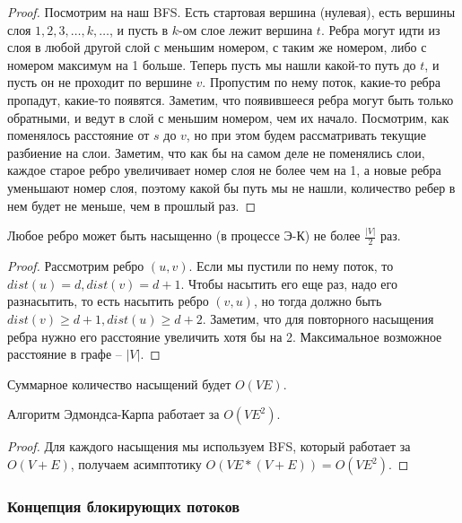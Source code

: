 \begin{proof}
    Посмотрим на наш BFS. Есть стартовая вершина (нулевая), есть вершины слоя $1, 2, 3, \ldots, k, \ldots$, и пусть в $k$-ом слое лежит вершина $t$. Ребра могут идти из слоя в любой другой слой с меньшим номером, с таким же номером, либо с номером максимум на 1 больше. Теперь пусть мы нашли какой-то путь до $t$, и пусть он не проходит по вершине $v$. Пропустим по нему поток, какие-то ребра пропадут, какие-то появятся. Заметим, что появившееся ребра могут быть только обратными, и ведут в слой с меньшим номером, чем их начало. Посмотрим, как поменялось расстояние от $s$ до $v$, но при этом будем рассматривать текущие разбиение на слои. Заметим, что как бы на самом деле не поменялись слои, каждое старое ребро увеличивает номер слоя не более чем на 1, а новые ребра уменьшают номер слоя, поэтому какой бы путь мы не нашли, количество ребер в нем будет не меньше, чем в прошлый раз.
\end{proof}

\begin{lemma}
    Любое ребро может быть насыщенно (в процессе Э-К) не более $\frac{|V|}{2}$ раз.
\end{lemma}

\begin{proof}
    Рассмотрим ребро $(u, v)$. Если мы пустили по нему поток, то $dist(u) = d, dist(v) = d + 1$. Чтобы насытить его еще раз, надо его разнасытить, то есть насытить ребро $(v, u)$, но тогда должно быть $dist(v) \geq d + 1, dist(u) \geq d + 2$. Заметим, что для повторного насыщения ребра нужно его расстояние увеличить хотя бы на 2. Максимальное возможное расстояние в графе -- $|V|$.
\end{proof}

\begin{corollary}
    Суммарное количество насыщений будет $O(VE)$.
\end{corollary}

\begin{theorem}
    Алгоритм Эдмондса-Карпа работает за $O(VE^2)$.
\end{theorem}

\begin{proof}
    Для каждого насыщения мы используем BFS, который работает за $O(V + E)$, получаем асимптотику $O(VE * (V + E)) = O(VE^2)$.
\end{proof}

\subsubsection{Концепция блокирующих потоков}


